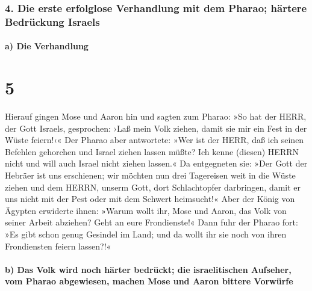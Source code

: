 \hypertarget{die-erste-erfolglose-verhandlung-mit-dem-pharao-huxe4rtere-bedruxfcckung-israels}{%
\subsubsection{4. Die erste erfolglose Verhandlung mit dem Pharao;
härtere Bedrückung
Israels}\label{die-erste-erfolglose-verhandlung-mit-dem-pharao-huxe4rtere-bedruxfcckung-israels}}

\hypertarget{a-die-verhandlung}{%
\paragraph{a) Die Verhandlung}\label{a-die-verhandlung}}

\hypertarget{section-4}{%
\section{5}\label{section-4}}

 Hierauf gingen Mose und Aaron hin und sagten zum Pharao:
»So hat der HERR, der Gott Israels, gesprochen: ›Laß mein Volk ziehen,
damit sie mir ein Fest in der Wüste feiern!‹«  Der Pharao
aber antwortete: »Wer ist der HERR, daß ich seinen Befehlen gehorchen
und Israel ziehen lassen müßte? Ich kenne (diesen) HERRN nicht und will
auch Israel nicht ziehen lassen.«  Da entgegneten sie:
»Der Gott der Hebräer ist uns erschienen; wir möchten nun drei
Tagereisen weit in die Wüste ziehen und dem HERRN, unserm Gott, dort
Schlachtopfer darbringen, damit er uns nicht mit der Pest oder mit dem
Schwert heimsucht!«  Aber der König von Ägypten erwiderte
ihnen: »Warum wollt ihr, Mose und Aaron, das Volk von seiner Arbeit
abziehen? Geht an eure Frondienste!«  Dann fuhr der Pharao
fort: »Es gibt schon genug Gesindel im Land; und da wollt ihr sie noch
von ihren Frondiensten feiern lassen?!«

\hypertarget{b-das-volk-wird-noch-huxe4rter-bedruxfcckt-die-israelitischen-aufseher-vom-pharao-abgewiesen-machen-mose-und-aaron-bittere-vorwuxfcrfe}{%
\paragraph{b) Das Volk wird noch härter bedrückt; die israelitischen
Aufseher, vom Pharao abgewiesen, machen Mose und Aaron bittere
Vorwürfe}\label{b-das-volk-wird-noch-huxe4rter-bedruxfcckt-die-israelitischen-aufseher-vom-pharao-abgewiesen-machen-mose-und-aaron-bittere-vorwuxfcrfe}}

